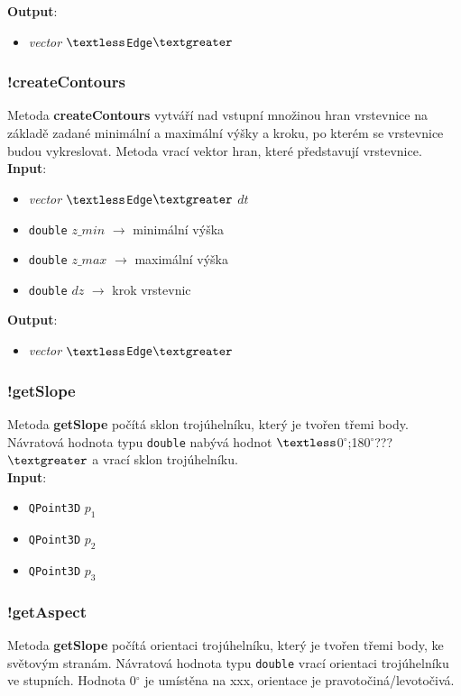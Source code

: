\documentclass[a4paper, 12pt]{article}
\begin{document}
\textbf{Output}:
\begin{itemize}
\item \textsl{vector} $\textless$\texttt{Edge}$\textgreater$
\end{itemize}

\subsubsection*{!createContours}
Metoda \textbf{createContours} vytváří nad vstupní množinou hran vrstevnice na základě zadané minimální a maximální výšky a kroku, po kterém se vrstevnice budou vykreslovat.  Metoda vrací vektor hran, které představují vrstevnice.\\

\textbf{Input}:
\begin{itemize}
\item \textsl{vector} $\textless$\texttt{Edge}$\textgreater$ $dt$
\item \texttt{double} $z\_min$ $\rightarrow$ minimální výška
\item \texttt{double} $z\_max$ $\rightarrow$ maximální výška
\item \texttt{double} $dz$ $\rightarrow$ krok vrstevnic
\end{itemize}

\textbf{Output}:
\begin{itemize}
\item \textsl{vector} $\textless$\texttt{Edge}$\textgreater$
\end{itemize}

\subsubsection*{!getSlope}
Metoda \textbf{getSlope} počítá sklon trojúhelníku, který je tvořen třemi body. Návratová hodnota typu \texttt{double} nabývá hodnot $\textless$0$^\circ$;180$^\circ$???$\textgreater$ a vrací sklon trojúhelníku.\\

\textbf{Input}:
\begin{itemize}
\item \texttt{QPoint3D} $p_1$
\item \texttt{QPoint3D} $p_2$
\item \texttt{QPoint3D} $p_3$
\end{itemize}

\subsubsection*{!getAspect}
Metoda \textbf{getSlope} počítá orientaci trojúhelníku, který je tvořen třemi body, ke světovým stranám. Návratová hodnota typu \texttt{double} vrací orientaci trojúhelníku ve stupních. Hodnota 0$^\circ$ je umístěna na xxx, orientace je pravotočiná/levotočivá.\\
\end{document}
